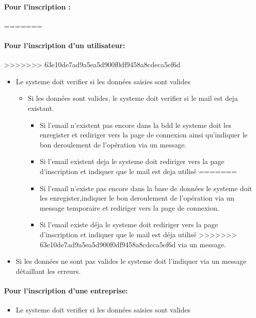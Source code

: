 \documentclass{article}
\begin{document}
\begin{itemize}
\begin{itemize}
\paragraph{Pour l'inscription : }
=======

\paragraph{Pour l'inscription d'un utilisateur: }
>>>>>>> 63e10de7ad9a5ea5d900f0df9458a8cdeca5ef6d
\begin{itemize}
\item Le systeme doit verifier si les données saisies sont valides
	\begin{itemize}
	\item Si les données sont valides, le systeme doit verifier si le mail
		est deja existant.
		\begin{itemize}
<<<<<<< HEAD
		\item Si l'email n'existent pas encore dans la bdd le systeme
			doit les enregister et rediriger vers la page de connexion
			ainsi qu'indiquer le bon deroulement de l'opération via un message.
		\item Si l'email existent deja le systeme doit rediriger vers
			la page d'inscription et indiquer que le mail est deja utilisé
=======
		\item Si l'email n'existe pas encore dans la base de données le systeme
			doit les enregister,indiquer le bon deroulement de l'opération via un message temporaire et rediriger vers la page de connexion.
		\item Si l'email existe déja le systeme doit rediriger vers
			la page d'inscription et indiquer que le mail est déja utilisé
>>>>>>> 63e10de7ad9a5ea5d900f0df9458a8cdeca5ef6d
			via un message.
		\end{itemize}
	\end{itemize}
\item Si les données ne sont pas valides le systeme doit l'indiquer
	via un message détaillant les erreurs.
\end{itemize}

\paragraph{Pour l'inscription d'une entreprise: }
\begin{itemize}
\item Le systeme doit verifier si les données saisies sont valides
	

\end{itemize}
\end{itemize}
\end{itemize}
\end{document}
